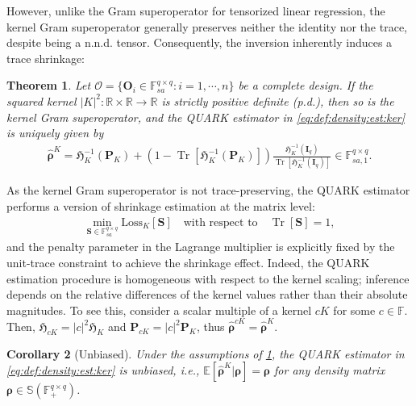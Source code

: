 \documentclass[noinfoline]{imsart}\setcounter{tocdepth}{2}
\renewcommand{\b}[1]{\mathbb{#1}} %
\newcommand{\m}[1]{\mathbf{#1}} %
\newcommand{\s}[1]{\mathscr{#1}} %
\newcommand{\f}[1]{\mathfrak{#1}} %
\newcommand{\mb}[1]{\boldsymbol{#1}} %
\newcommand{\tr}[1]{\operatorname{Tr}\left[#1\right]}
\theoremstyle{plain}
\newtheorem{theorem}{Theorem}[section]
\newtheorem{corollary}[theorem]{Corollary}
\begin{document}
However, unlike the Gram superoperator for tensorized linear regression, the kernel Gram superoperator generally preserves neither the identity nor the trace, despite being a n.n.d. tensor. Consequently, the inversion inherently induces a trace shrinkage:
\begin{theorem}\label{thm:quark:supop:pd}
Let $\s{O} = \{\m{O}_{i} \in \b{F}_{sa}^{q \times q}: i = 1, \cdots, n\}$ be a complete design. If the squared kernel $|K|^2 : \b{R} \times \b{R} \to \b{R}$ is strictly positive definite (p.d.), then so is the kernel Gram superoperator, and the QUARK estimator in \eqref{eq:def:density:est:ker} is uniquely given by
\begin{align*}
    \hat{\mb{\rho}}^{K} = \f{H}_{K}^{-1}(\m{P}_{K}) + (1 - \tr{\f{H}_{K}^{-1}(\m{P}_{K})}) \frac{\f{H}_{K}^{-1}(\m{I}_{q})}{\tr{\f{H}_{K}^{-1}(\m{I}_{q})}} \in \b{F}_{sa, 1}^{q \times q}.
\end{align*}
\end{theorem}


As the kernel Gram superoperator is not trace-preserving, the QUARK estimator performs a version of shrinkage estimation at the matrix level:
\begin{align*}
    \min_{\m{S} \in \b{F}_{sa}^{q \times q}} \mathrm{Loss}_{K}[\m{S}] \quad \text{with respect to} \quad \tr{\m{S}}=1,
\end{align*}
and the penalty parameter in the Lagrange multiplier is explicitly fixed by the unit-trace constraint to achieve the shrinkage effect.
Indeed, the QUARK estimation procedure is homogeneous with respect to the kernel scaling; inference depends on the relative differences of the kernel values rather than their absolute magnitudes. To see this, consider a scalar multiple of a kernel $c K$ for some $c \in \b{F}$. Then, $\f{H}_{cK} = |c|^{2} \f{H}_{K}$ and $\m{P}_{cK} = |c|^{2} \m{P}_{K}$, thus $\hat{\mb{\rho}}^{c K} = \hat{\mb{\rho}}^{K}$.



\begin{corollary}[Unbiased]\label{cor:unbiased}
Under the assumptions of \cref{thm:quark:supop:pd}, the QUARK estimator in \eqref{eq:def:density:est:ker} is unbiased, i.e., $\b{E}[\hat{\mb{\rho}}^{K} \vert \mb{\rho}] = \mb{\rho}$ for any density matrix $\mb{\rho} \in \b{S}(\b{F}_{+}^{q \times q})$.
\end{corollary}
\end{document}
